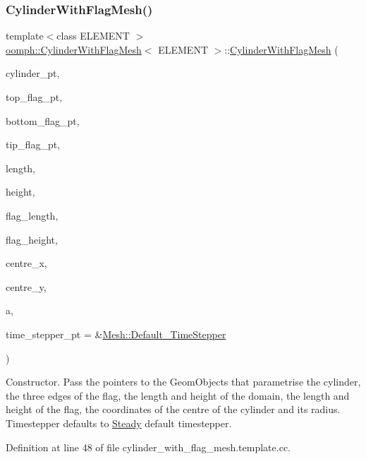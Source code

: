 \subsubsection{\texorpdfstring{Cylinder\+With\+Flag\+Mesh()}{CylinderWithFlagMesh()}}
{\footnotesize\ttfamily template$<$class E\+L\+E\+M\+E\+NT $>$ \\
\hyperlink{classoomph_1_1CylinderWithFlagMesh}{oomph\+::\+Cylinder\+With\+Flag\+Mesh}$<$ E\+L\+E\+M\+E\+NT $>$\+::\hyperlink{classoomph_1_1CylinderWithFlagMesh}{Cylinder\+With\+Flag\+Mesh} (\begin{DoxyParamCaption}\item[{\hyperlink{classoomph_1_1Circle}{Circle} $\ast$}]{cylinder\+\_\+pt,  }\item[{\hyperlink{classoomph_1_1GeomObject}{Geom\+Object} $\ast$}]{top\+\_\+flag\+\_\+pt,  }\item[{\hyperlink{classoomph_1_1GeomObject}{Geom\+Object} $\ast$}]{bottom\+\_\+flag\+\_\+pt,  }\item[{\hyperlink{classoomph_1_1GeomObject}{Geom\+Object} $\ast$}]{tip\+\_\+flag\+\_\+pt,  }\item[{const double \&}]{length,  }\item[{const double \&}]{height,  }\item[{const double \&}]{flag\+\_\+length,  }\item[{const double \&}]{flag\+\_\+height,  }\item[{const double \&}]{centre\+\_\+x,  }\item[{const double \&}]{centre\+\_\+y,  }\item[{const double \&}]{a,  }\item[{\hyperlink{classoomph_1_1TimeStepper}{Time\+Stepper} $\ast$}]{time\+\_\+stepper\+\_\+pt = {\ttfamily \&\hyperlink{classoomph_1_1Mesh_a12243d0fee2b1fcee729ee5a4777ea10}{Mesh\+::\+Default\+\_\+\+Time\+Stepper}} }\end{DoxyParamCaption})}



Constructor. Pass the pointers to the Geom\+Objects that parametrise the cylinder, the three edges of the flag, the length and height of the domain, the length and height of the flag, the coordinates of the centre of the cylinder and its radius. Timestepper defaults to \hyperlink{classoomph_1_1Steady}{Steady} default timestepper. 



Definition at line 48 of file cylinder\+\_\+with\+\_\+flag\+\_\+mesh.\+template.\+cc.



